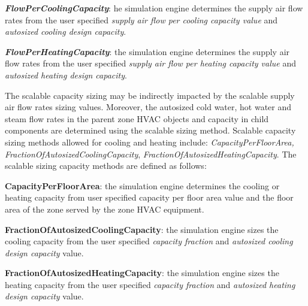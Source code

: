 \textbf{\emph{FlowPerCoolingCapacity}}: he simulation engine determines the supply air flow rates from the user specified \emph{supply air flow per cooling capacity value} and \emph{autosized cooling design capacity}.

\textbf{\emph{FlowPerHeatingCapacity}}: the simulation engine determines the supply air flow rates from the user specified \emph{supply air flow per heating capacity value} and \emph{autosized heating design capacity}.

The scalable capacity sizing may be indirectly impacted by the scalable supply air flow rates sizing values. Moreover, the autosized cold water, hot water and steam flow rates in the parent zone HVAC objects and capacity in child components are determined using the scalable sizing method. Scalable capacity sizing methods allowed for cooling and heating include: \emph{CapacityPerFloorArea, FractionOfAutosizedCoolingCapacity}, \emph{FractionOfAutosizedHeatingCapacity}. The scalable sizing capacity methods are defined as follows:

\textbf{CapacityPerFloorArea}: the simulation engine determines the cooling or heating capacity from user specified capacity per floor area value and the floor area of the zone served by the zone HVAC equipment.

\textbf{FractionOfAutosizedCoolingCapacity}: the simulation engine sizes the cooling capacity from the user specified \emph{capacity fraction} and \emph{autosized cooling design capacity} value.

\textbf{FractionOfAutosizedHeatingCapacity}: the simulation engine sizes the heating capacity from the user specified \emph{capacity fraction} and \emph{autosized heating design capacity} value.
